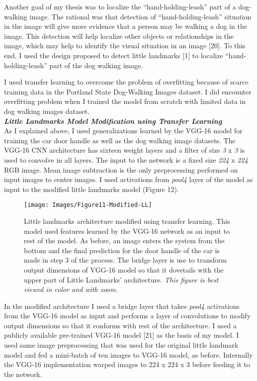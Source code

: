 \documentclass [11pt,letterpaper ,twoside ,openany ]{report}
\begin{document}
    Another goal of my thesis was to localize the ``hand-holding-leash'' part of a dog-walking image. The rational was that detection of ``hand-holding-leash'' situation in the image will give more evidence that a person may be walking a dog in the image. This detection will help localize other objects or relationships in the image, which may help to identify the visual situation in an image [20]. To this end, I used the design proposed to detect little landmarks [1] to localize ``hand-holding-leash'' part of the dog walking image. 

    I used transfer learning to overcome the problem of overfitting because of scarce training data in the Portland State Dog-Walking Images dataset. I did encounter overfitting problem when I trained the model from scratch with limited data in dog walking images dataset. \\

    \noindent
    \textbf{\textit{Little Landmarks Model Modification using Transfer Learning}}\\                   
    As I explained above, I used generalizations learned by the VGG-16 model for training the car door handle as well as the dog walking image datasets.  The VGG-16 CNN architecture has sixteen weight layers and a filter of size \textit{3} x \textit{3} is used to convolve in all layers. The input to the network is a fixed size \textit{224} x \textit{224} RGB image. Mean image subtraction is the only preprocessing performed on input images to center images. I used activations from \textit{pool4} layer of the model as input to the modified little landmarks model (Figure 12).     

    \begin{figure}[h]
      \centering
      \texttt{[image: Images/Figure11-Modified-LL]}
      \caption{Little landmarks architecture modified using transfer learning. This model used features learned by the VGG-16 network as an input to rest of the model. As before, an image enters the system from the bottom and the final prediction for the door handle of the car is made in step 3 of the process. The bridge layer is use to transform output dimensions of VGG-16 model so that it dovetails with the upper part of Little Landmarks' architecture. \textit{This figure is best viewed in color and with zoom.}}
      \label{fig:tl_arch}
    \end{figure}        

    In the modified architecture I used a bridge layer that takes \textit{pool4} activations from the VGG-16 model as input and performs a layer of convolutions to modify output dimensions so that it conforms with rest of the architecture. I used a publicly available pre-trained VGG-16 model [21] as the basis of my model. I used same image preprocessing that was used for the original little landmark model and fed a mini-batch of ten images to VGG-16 model, as before. Internally the VGG-16 implementation warped images to 224 x 224 x 3 before feeding it to the network.    
\end{document}
